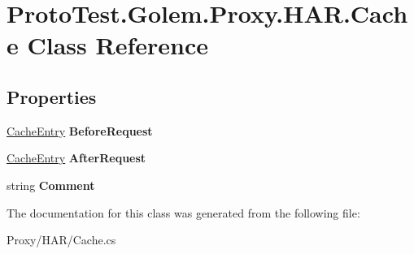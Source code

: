 \hypertarget{class_proto_test_1_1_golem_1_1_proxy_1_1_h_a_r_1_1_cache}{\section{Proto\-Test.\-Golem.\-Proxy.\-H\-A\-R.\-Cache Class Reference}
\label{class_proto_test_1_1_golem_1_1_proxy_1_1_h_a_r_1_1_cache}
}
\subsection*{Properties}
\begin{DoxyCompactItemize}
\item 
\hypertarget{class_proto_test_1_1_golem_1_1_proxy_1_1_h_a_r_1_1_cache_aa602c614bc66e67538ee6ac4ef9f6407}{\hyperlink{class_proto_test_1_1_golem_1_1_proxy_1_1_h_a_r_1_1_cache_entry}{Cache\-Entry} {\bfseries Before\-Request}}\label{class_proto_test_1_1_golem_1_1_proxy_1_1_h_a_r_1_1_cache_aa602c614bc66e67538ee6ac4ef9f6407}

\item 
\hypertarget{class_proto_test_1_1_golem_1_1_proxy_1_1_h_a_r_1_1_cache_ae68ce565a0a9bf0e9784a56413380036}{\hyperlink{class_proto_test_1_1_golem_1_1_proxy_1_1_h_a_r_1_1_cache_entry}{Cache\-Entry} {\bfseries After\-Request}}\label{class_proto_test_1_1_golem_1_1_proxy_1_1_h_a_r_1_1_cache_ae68ce565a0a9bf0e9784a56413380036}

\item 
\hypertarget{class_proto_test_1_1_golem_1_1_proxy_1_1_h_a_r_1_1_cache_a5f33370dfd64e7e67b87c8d7bb1c24d5}{string {\bfseries Comment}}\label{class_proto_test_1_1_golem_1_1_proxy_1_1_h_a_r_1_1_cache_a5f33370dfd64e7e67b87c8d7bb1c24d5}

\end{DoxyCompactItemize}


The documentation for this class was generated from the following file\-:\begin{DoxyCompactItemize}
\item 
Proxy/\-H\-A\-R/Cache.\-cs\end{DoxyCompactItemize}
